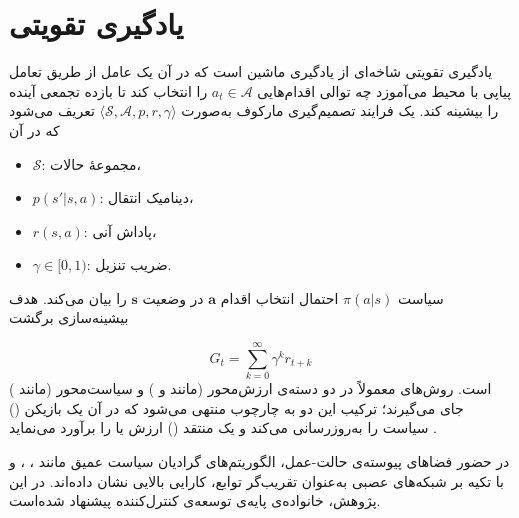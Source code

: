 %

\section{یادگیری تقویتی}\label{sec:rl}

یادگیری تقویتی
 شاخه‌ای از یادگیری ماشین است که در آن یک عامل از طریق تعامل پیاپی با محیط می‌آموزد چه توالی اقدام‌هایی $a_t\in\mathcal{A}$ را انتخاب کند تا بازده تجمعی آینده را بیشینه کند. یک فرایند تصمیم‌گیری مارکوف
  به‌صورت $\langle\mathcal{S},\mathcal{A},p,r,\gamma\rangle$ تعریف می‌شود که در آن
\begin{itemize}
	\item $\mathcal{S}$:
	 مجموعهٔ حالات،
	\item $p(s'|s,a)$:
	 دینامیک انتقال،
	\item $r(s,a)$:
	 پاداش آنی،
	\item $\gamma\in[0,1)$:
	 ضریب تنزیل.
\end{itemize}
\noindent
سیاست
 $\pi(a|s)$ احتمال انتخاب اقدام $\boldsymbol{a}$ در وضعیت $\boldsymbol{s}$ را بیان می‌کند. هدف بیشینه‌سازی برگشت
  
 \begin{equation}
 	G_t=\sum_{k=0}^{\infty}\gamma^k r_{t+k}
 \end{equation}
  است. روش‌های  معمولاً در دو دسته‌ی {ارزش‌محور} (مانند  و ) و {سیاست‌محور} (مانند ) جای می‌گیرند؛ ترکیب این دو به چارچوب  منتهی می‌شود که در آن یک بازیکن () سیاست را به‌روزرسانی می‌کند و یک منتقد () ارزش یا  را برآورد می‌نماید
  \cite{SuttonBarto2018}.

در حضور فضاهای پیوسته‌ی حالت-عمل، الگوریتم‌های گرادیان سیاست عمیق مانند ، ،  و  با تکیه بر شبکه‌های عصبی به‌عنوان تقریب‌گر توابع، کارایی بالایی نشان داده‌اند. در این پژوهش، خانواده‌ی  پایه‌ی توسعه‌ی کنترل‌کننده پیشنهاد شده‌است.



